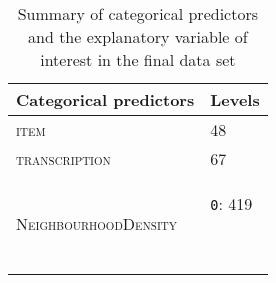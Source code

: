 \begin{table}[H]\fontsize{10}{11}
\caption{Summary of categorical predictors and the explanatory variable of interest in the final data set}
\label{tab:4.2}
\centering
\begin{tabular}{ll}
\lsptoprule
Categorical predictors                & Levels                                                   \\
\midrule
\textsc{item}                                  & 48                                                       \\
\textsc{transcription}                         & 67                                                       \\
\multirow{2}{*}{\textsc{NeighbourhoodDensity}} & \texttt{0}: 419

~ ~~


\end{tabular}
\end{table}
